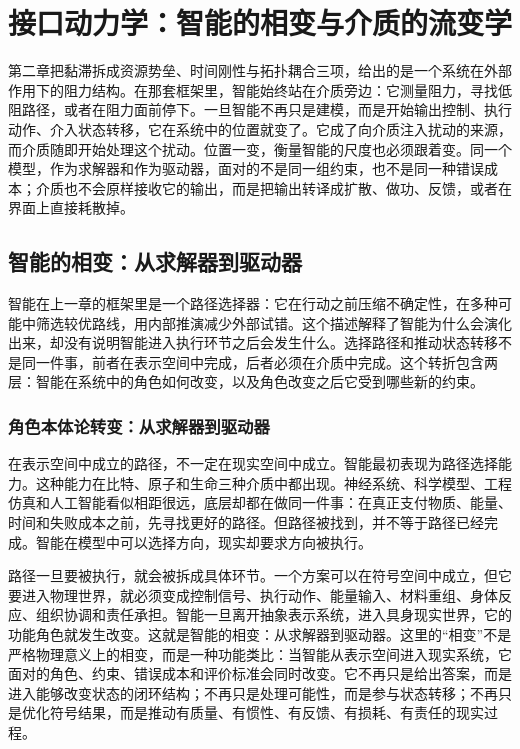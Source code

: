 \chapter{接口动力学：智能的相变与介质的流变学}

第二章把黏滞拆成资源势垒、时间刚性与拓扑耦合三项，给出的是一个系统在外部作用下的阻力结构。在那套框架里，智能始终站在介质旁边：它测量阻力，寻找低阻路径，或者在阻力面前停下。一旦智能不再只是建模，而是开始输出控制、执行动作、介入状态转移，它在系统中的位置就变了。它成了向介质注入扰动的来源，而介质随即开始处理这个扰动。位置一变，衡量智能的尺度也必须跟着变。同一个模型，作为求解器和作为驱动器，面对的不是同一组约束，也不是同一种错误成本；介质也不会原样接收它的输出，而是把输出转译成扩散、做功、反馈，或者在界面上直接耗散掉。

\section{智能的相变：从求解器到驱动器}

智能在上一章的框架里是一个路径选择器：它在行动之前压缩不确定性，在多种可能中筛选较优路线，用内部推演减少外部试错。这个描述解释了智能为什么会演化出来，却没有说明智能进入执行环节之后会发生什么。选择路径和推动状态转移不是同一件事，前者在表示空间中完成，后者必须在介质中完成。这个转折包含两层：智能在系统中的角色如何改变，以及角色改变之后它受到哪些新的约束。

\subsection{角色本体论转变：从求解器到驱动器}

在表示空间中成立的路径，不一定在现实空间中成立。智能最初表现为路径选择能力。这种能力在比特、原子和生命三种介质中都出现。神经系统、科学模型、工程仿真和人工智能看似相距很远，底层却都在做同一件事：在真正支付物质、能量、时间和失败成本之前，先寻找更好的路径。但路径被找到，并不等于路径已经完成。智能在模型中可以选择方向，现实却要求方向被执行。


路径一旦要被执行，就会被拆成具体环节。一个方案可以在符号空间中成立，但它要进入物理世界，就必须变成控制信号、执行动作、能量输入、材料重组、身体反应、组织协调和责任承担。智能一旦离开抽象表示系统，进入具身现实世界，它的功能角色就发生改变。这就是智能的相变：从求解器到驱动器。这里的“相变”不是严格物理意义上的相变，而是一种功能类比：当智能从表示空间进入现实系统，它面对的角色、约束、错误成本和评价标准会同时改变。它不再只是给出答案，而是进入能够改变状态的闭环结构；不再只是处理可能性，而是参与状态转移；不再只是优化符号结果，而是推动有质量、有惯性、有反馈、有损耗、有责任的现实过程。

